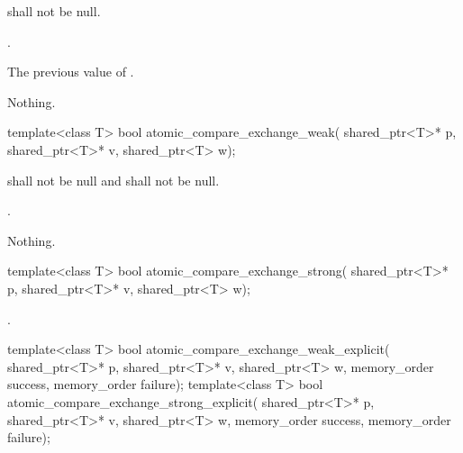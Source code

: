 \begin{itemdescr}
\pnum
\requires {} shall not be null.

\pnum
\effects {}.

\pnum
\returns The previous value of .

\pnum
\throws Nothing.
\end{itemdescr}

%
%
\begin{itemdecl}
template<class T>
  bool atomic_compare_exchange_weak(
    shared_ptr<T>* p, shared_ptr<T>* v, shared_ptr<T> w);
\end{itemdecl}

\begin{itemdescr}
\pnum
\requires {} shall not be null and  shall not be null.

\pnum
\returns {}.

\pnum
\throws Nothing.
\end{itemdescr}

%
%
\begin{itemdecl}
template<class T>
  bool atomic_compare_exchange_strong(
    shared_ptr<T>* p, shared_ptr<T>* v, shared_ptr<T> w);
\end{itemdecl}

\begin{itemdescr}
\pnum
\returns {}
.
\end{itemdescr}

%
%
%
%
\begin{itemdecl}
template<class T>
  bool atomic_compare_exchange_weak_explicit(
    shared_ptr<T>* p, shared_ptr<T>* v, shared_ptr<T> w,
    memory_order success, memory_order failure);
template<class T>
  bool atomic_compare_exchange_strong_explicit(
    shared_ptr<T>* p, shared_ptr<T>* v, shared_ptr<T> w,
    memory_order success, memory_order failure);
\end{itemdecl}

